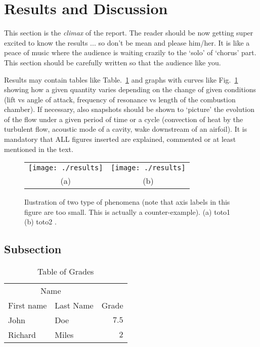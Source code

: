 \documentclass[fleqn,12pt]{NTFD} %
\begin{document}

\section{Results and Discussion}

This section is the {\it climax} of the report. The reader should be now getting super excited to know the results ... so don't be mean and please him/her. It is like a peace of music where the audience is waiting crazily to the `solo' of `chorus' part. This section should be carefully written so that the audience like you.

Results may contain tables like Table.~\ref{tab:label} and graphs with curves like Fig.~\ref{fig:results} showing how a given quantity varies depending on the change of given conditions (lift vs angle of attack, frequency of resonance vs length of the combustion chamber). If necessary, also snapshots should be shown to `picture' the evolution of the flow under a given period of time or a cycle (convection of heat by the turbulent flow, acoustic mode of a cavity, wake downstream of an airfoil). It is mandatory that ALL figures inserted are explained, commented or at least mentioned in the text.

\begin{figure}[tb]
\centering
\begin{tabular}{cc}
\texttt{[image: ./results]} & \texttt{[image: ./results]} \\
(a) & (b)
\end{tabular}
\caption{Ilustration of two type of  phenomena (note that axis labels in this figure are too small. This is actually a counter-example). (a) toto1 (b) toto2 .}
\label{fig:results}
\end{figure}


\lipsum[10] %

\subsection{Subsection}

\lipsum[11] %

\begin{table}[hbt]
\caption{Table of Grades}
\centering
\begin{tabular}{llr}
\toprule
\multicolumn{2}{c}{Name} \\
\cmidrule(r){1-2}
First name & Last Name & Grade \\
\midrule
John & Doe & $7.5$ \\
Richard & Miles & $2$ \\
\bottomrule
\end{tabular}
\label{tab:label}
\end{table}
\end{document}
